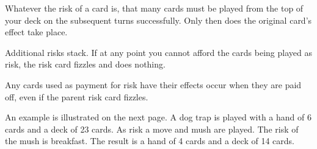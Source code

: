 \documentclass{article}
\begin{document}
Whatever the risk of a card is, that many cards must be played from the top of
your deck on the subsequent turns successfully. Only then does the original
card's effect take place.

Additional risks stack. If at any point you cannot afford the cards being played
as risk, the risk card fizzles and does nothing.

Any cards used as payment for risk have their effects occur when they are paid
off, even if the parent risk card fizzles.

An example is illustrated on the next page. A dog trap is played with a hand of
6 cards and a deck of 23 cards. As risk a move and mush are played. The risk of
the mush is breakfast. The result is a hand of 4 cards and a deck of 14 cards.

\clearpage
\end{document}
